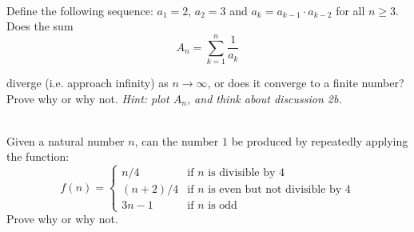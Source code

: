 \documentclass[11pt]{article}
\newif\ifsolutions
\begin{document}
\begin{qunlist}
\begin{itemize}
\ifsolutions
\textcolor{blue}{
\textbf{Solutions:} 
}
\fi

\end{itemize}



%
%
%



 \\
Define the following sequence: $a_1 =2$, $a_2 = 3$ and $a_k = a_{k-1} \cdot a_{k-2}$ for all $n \geq 3$. \\ 
Does the sum 
\[ A_n = \sum_{k=1}^n \frac{1}{a_k} \]

diverge (i.e. approach infinity) as $n \to \infty$, or does it converge to a finite number?  
Prove why or why not.
{\em Hint: plot $A_n$, and think about discussion 2b.}

\ifsolutions
\textbf{Solutions:}
It does converge. We can first use strong induction to prove the claim
\[ a_k > 2^k, \quad \forall k \geq 4 \] 

For the base cases we have $a_4 = a_3 \cdot a_2 = 6 \cdot 3 = 18 > 2^4$ 
and $a_5 = a_4 \cdot a_3 = 18 \cdot 6 = 108 > 2^5$. Then for the inductive step we have
\[ a_{k+1} = a_k \cdot a_{k-1} > 2^k \cdot 2^{k-1} = 2^{2k-1} > 2^{k+1} \]

Therefore:
\[ \sum_{k=4}^n \frac{1}{a_k} < \sum_{k=4}^n \frac{1}{2^k} \]

Since the RHS converges as $n \to \infty$, we know the LHS converges.  
Adding a constant (i.e. the first three terms) does not change the fact that it converges.
\fi



 \\ 
Given a natural number $n$, can the number $1$ be produced 
by repeatedly applying the function:
\[ f(n) = \left\{ \begin{array}{cl} n/4 & \text{if $n$ is divisible by 4} \\
(n+2)/4 & \text{if $n$ is even but not divisible by 4} \\
3n - 1 & \text{if $n$ is odd} \end{array} \right. \]
Prove why or why not.


\end{qunlist}
\end{document}
